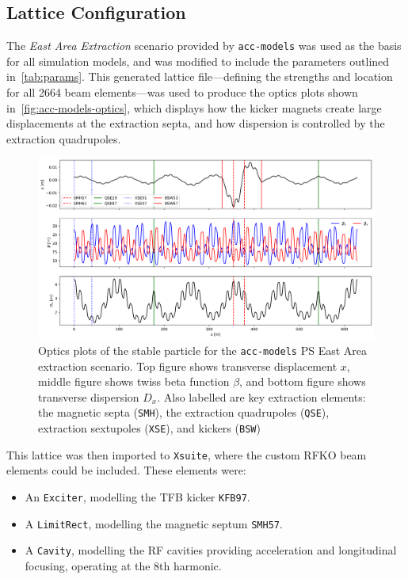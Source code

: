 \documentclass[11pt]{report}
\begin{document}
\subsection{Lattice Configuration} %

The \textit{East Area Extraction} scenario provided by \verb|acc-models| was used as the basis for all simulation models, and was modified to include the parameters outlined in~\autoref{tab:params}. This generated lattice file---defining the strengths and location for all 2664 beam elements---was used to produce the optics plots shown in~\autoref{fig:acc-models-optics}, which displays how the kicker magnets create large displacements at the extraction septa, and how dispersion is controlled by the extraction quadrupoles.

\begin{figure}[h]
  \centering
  \includegraphics[width=1.1\linewidth]{optics.png}
  \cprotect\caption{Optics plots of the stable particle for the \verb|acc-models| PS East Area extraction scenario. Top figure shows transverse displacement $x$, middle figure shows twiss beta function $\beta$, and bottom figure shows transverse dispersion $D_x$. Also labelled are key extraction elements: the magnetic septa (\verb|SMH|), the extraction quadrupoles (\verb|QSE|), extraction sextupoles (\verb|XSE|), and kickers (\verb|BSW|)}\label{fig:acc-models-optics}
\end{figure}

This lattice was then imported to \verb|Xsuite|, where the custom RFKO beam elements could be included. These elements were:
\begin{itemize}
  \item An \verb|Exciter|, modelling the TFB kicker \verb|KFB97|.
  \item A \verb|LimitRect|, modelling the magnetic septum \verb|SMH57|.
  \item A \verb|Cavity|, modelling the RF cavities providing acceleration and longitudinal focusing, operating at the 8th harmonic.
\end{itemize}
\end{document}
